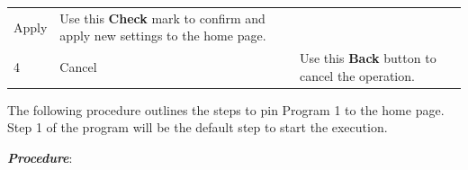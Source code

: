 \begin{longtable}[]{@{}|l|l|l|@{}}
\begin{minipage}[t]{0.23\columnwidth}
Apply\strut
\end{minipage} & \begin{minipage}[t]{0.65\columnwidth}\raggedright
Use this \textbf{Check} mark to confirm and apply new settings to the
home page.\strut
\end{minipage}\tabularnewline
\begin{minipage}[t]{0.04\columnwidth}\raggedright
4\strut
\end{minipage} & \begin{minipage}[t]{0.23\columnwidth}\raggedright
Cancel\strut
\end{minipage} & \begin{minipage}[t]{0.65\columnwidth}\raggedright
Use this \textbf{Back} button to cancel the operation.\strut
\end{minipage}\tabularnewline
\bottomrule
\end{longtable}

The following procedure outlines the steps to pin Program 1 to the home
page. Step 1 of the program will be the default step to start the
execution.

\textbf{\emph{Procedure}}:

